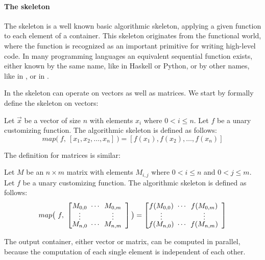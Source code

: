 

\paragraph{The \map skeleton}
The \map skeleton is a well known basic algorithmic skeleton, applying a given function to each element of a container.
This skeleton originates from the functional world, where the  function is recognized as an important primitive for writing high-level code.
In many programming languages an equivalent sequential function exists, either known by the same name, like in Haskell or Python, or by other names, like  in \Cpp, or  in \Csharp.

In \SkelCL the \map skeleton can operate on vectors as well as matrices.
We start by formally define the skeleton on vectors:
\begin{definition}
  \label{definition:map}
  Let $\vec{x}$ be a vector of size $n$ with elements $x_i$ where $0 < i \leq n$.
  Let $f$ be a unary customizing function.
  The algorithmic skeleton \map is defined as follows:
  \begin{equation}
    map \big(\ f,\ [x_1, x_2, \dots, x_n]\ \big) = [f(x_1), f(x_2), \dots, f(x_n)]
  \end{equation}
\end{definition}
\noindent
The definition for matrices is similar:
\begin{definition}
  \label{definition:map:matrix}
  Let $M$ be an $n\times m$ matrix with elements $M_{i,j}$ where $0 < i \leq n$ and $0 < j \leq m$.
  Let $f$ be a unary customizing function.
  The algorithmic skeleton \map is defined as follows:
  \begin{equation}
    map\big(\ f,\ \DottedMatrix{M_{0,0}}{M_{0,m}}{M_{n,0}}{M_{n,m}} \big)
      = \DottedMatrix{f(M_{0,0})}{f(M_{0,m})}{f(M_{n,0})}{f(M_{n,m})}
  \end{equation}
\end{definition}
\noindent
The output container, either vector or matrix, can be computed in parallel, because the computation of each single element is independent of each other.

